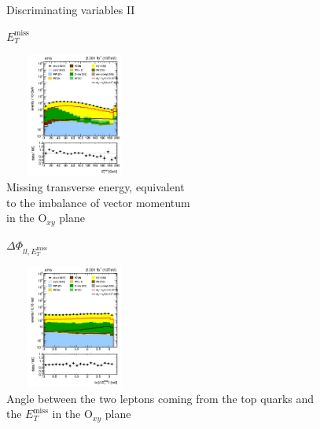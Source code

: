 \documentclass[handout,8 pt]{beamer}
\begin{document}
\begin{frame}{Discriminating variables II}

	\begin{minipage}[c]{.48\linewidth}
	
   	\begin{center}
	\begin{exampleblock}{} { \begin{center} \vspace{0.6pt} $E_T^{\text{miss}}$ \vspace{0.6pt} \end{center}} \end{exampleblock} \vspace{5pt}
	\includegraphics[width= 130pt, height= 115pt]{figs/metPfType1_log-preSel3.png} \\
	Missing transverse energy, equivalent \\ to the imbalance of vector momentum \\ in the O$_{xy}$ plane
	\end{center}
	
	\end{minipage}
	\hspace{5pt}
	 \begin{minipage}[c]{.48\linewidth}
   	
	\begin{center}
	\begin{exampleblock}{} { \begin{center} $\Delta \Phi_{ll, E_T^{\text{miss}}}$ \end{center}} \end{exampleblock} \vspace{5pt}
	\includegraphics[width= 130pt, height= 115pt]{figs/dphillmet_log-preSel3.png} \\
	Angle between the two leptons coming from the top quarks and \\ the $E_T^{\text{miss}}$ in the O$_{xy}$ plane
	\end{center}
	

\end{minipage}
\end{frame}
\end{document}
